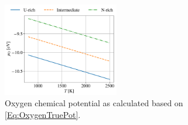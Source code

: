 \documentclass[preprint,12pt,sort&compress]{elsarticle}
\newcommand{\?}{\stackrel{?}{=}}
\begin{document}
\begin{figure}[h!]
    \centering
    \includegraphics[width=0.45\textwidth]{uO.png}
    \caption{Oxygen chemical potential as calculated based on \cref{Eq:OxygenTruePot}.}
    \label{Fig:uO}
\end{figure}

\FloatBarrier



\end{document}
